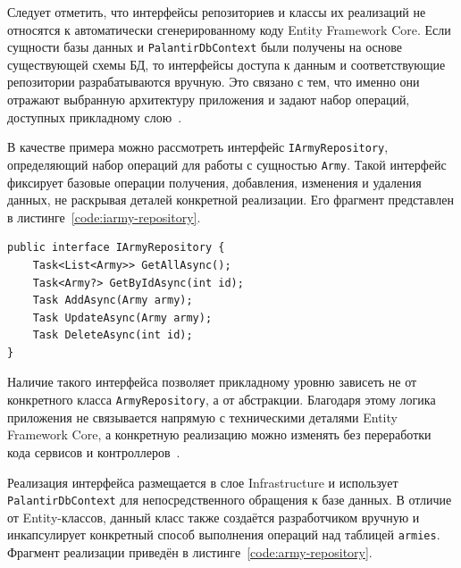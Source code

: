 Следует отметить, что интерфейсы репозиториев и классы их реализаций не относятся к автоматически сгенерированному коду Entity Framework Core. Если сущности базы данных и \texttt{PalantirDbContext} были получены на основе существующей схемы БД, то интерфейсы доступа к данным и соответствующие репозитории разрабатываются вручную. Это связано с тем, что именно они отражают выбранную архитектуру приложения и задают набор операций, доступных прикладному слою~\cite{efcore_scaffolding}.

В качестве примера можно рассмотреть интерфейс \texttt{IArmyRepository}, определяющий набор операций для работы с сущностью \texttt{Army}. Такой интерфейс фиксирует базовые операции получения, добавления, изменения и удаления данных, не раскрывая деталей конкретной реализации. Его фрагмент представлен в листинге~\ref{code:iarmy-repository}.

\begin{code}
\label{code:iarmy-repository}
\vspace{-0.75cm}
\begin{verbatim}
public interface IArmyRepository {
    Task<List<Army>> GetAllAsync();
    Task<Army?> GetByIdAsync(int id);
    Task AddAsync(Army army);
    Task UpdateAsync(Army army);
    Task DeleteAsync(int id);
}
\end{verbatim}
\end{code}

Наличие такого интерфейса позволяет прикладному уровню зависеть не от конкретного класса \texttt{ArmyRepository}, а от абстракции. Благодаря этому логика приложения не связывается напрямую с техническими деталями Entity Framework Core, а конкретную реализацию можно изменять без переработки кода сервисов и контроллеров~\cite{fowler_repository}.

Реализация интерфейса размещается в слое Infrastructure и использует \texttt{PalantirDbContext} для непосредственного обращения к базе данных. В отличие от Entity-классов, данный класс также создаётся разработчиком вручную и инкапсулирует конкретный способ выполнения операций над таблицей \texttt{armies}. Фрагмент реализации приведён в листинге~\ref{code:army-repository}.

